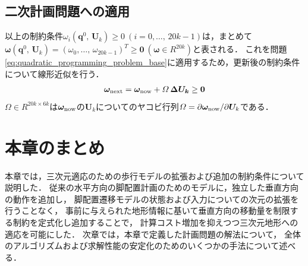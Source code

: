 \documentclass[autodetect-engine,dvipdfmx-if-dvi,ja=standard,a4j,jbase=11pt,magstyle=nomag*]{bxjsreport}
\begin{document}
\subsection{二次計画問題への適用}
以上の制約条件$\omega_i(\bm{q}^0 ,\, \bm{U}_k) \geq 0 \ (i = 0 , \dots ,\, 20k - 1)$は，まとめて$\bm{\omega} ( \bm{q}^0 ,\, \bm{U}_k ) = ( \omega_0 , \dots ,\, \omega_{20 k - 1} )^T \geq \bm{0}\ ( \bm{\omega }\in R^{20k} )$と表される．
これを問題\cref{eq:quadratic_programming_problem_base}に適用するため，更新後の制約条件について線形近似を行う．
\begin{equation}\begin{aligned} 
    \bm{\omega}_{\mathrm{next}} = \bm{\omega}_{\mathrm{now}} + \varOmega \, \bm{\Delta U_k} \geq \bm{0}
\end{aligned}\end{equation}
$\varOmega \in R^{20k \times 6k}$は$\bm{\omega}_{\mathrm{now}}$の$\bm{U}_k$についてのヤコビ行列$\varOmega = \partial \bm{\omega}_{\mathrm{now}} / \partial \bm{U}_k$である．


\section{本章のまとめ}
本章では，三次元適応のための歩行モデルの拡張および追加の制約条件について説明した．
従来の水平方向の脚配置計画のためのモデルに，独立した垂直方向の動作を追加し，
脚配置遷移モデルの状態および入力についての次元の拡張を行うことなく，
事前に与えられた地形情報に基いて垂直方向の移動量を制限する制約を定式化し追加することで，
計算コスト増加を抑えつつ三次元地形への適応を可能にした．
次章では，本章で定義した計画問題の解法について，
全体のアルゴリズムおよび求解性能の安定化のためのいくつかの手法について述べる．
\end{document}
